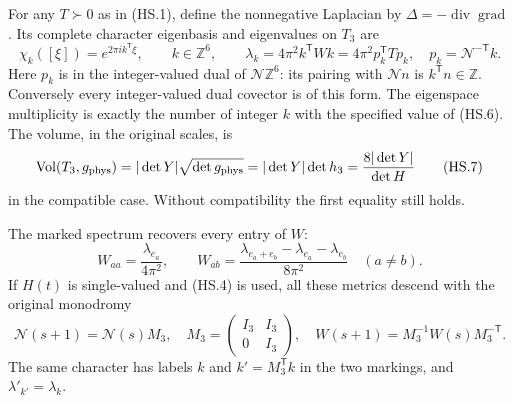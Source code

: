 \begin{theorem}
\label{q444:torus-laplace}
For any $T\succ0$ as in (HS.1), define the nonnegative Laplacian by
$\Delta=-\operatorname{div}\operatorname{grad}$. Its complete character
eigenbasis and eigenvalues on $T_3$ are
\[
 \chi_k([\xi])=e^{2\pi i k^{\mathsf T}\xi},\qquad k\in\mathbb Z^6,
 \qquad
 \lambda_k=4\pi^2 k^{\mathsf T}Wk
          =4\pi^2 p_k^{\mathsf T}Tp_k,\quad
 p_k=\mathcal N^{-\mathsf T}k.                               \tag{HS.6}
\]
Here $p_k$ is in the integer-valued dual of
$\mathcal N\mathbb Z^6$: its pairing with $\mathcal Nn$ is
$k^{\mathsf T}n\in\mathbb Z$. Conversely every integer-valued dual
covector is of this form. The eigenspace multiplicity is exactly
the number of integer $k$ with the specified value of (HS.6).
The volume, in the original scales, is
\[
 \operatorname{Vol}(T_3,g_{\rm phys})
 =|\det Y|\sqrt{\det g_{\rm phys}}
 =|\det Y|\det h_3
 =\frac{8|\det Y|}{\det H}                                  \tag{HS.7}
\]
in the compatible case. Without compatibility the first equality
still holds.

The marked spectrum recovers every entry of $W$:
\[
 W_{aa}=\frac{\lambda_{e_a}}{4\pi^2},\qquad
 W_{ab}=
 \frac{\lambda_{e_a+e_b}-\lambda_{e_a}-\lambda_{e_b}}{8\pi^2}
 \quad(a\ne b).                                             \tag{HS.8}
\]
If $H(t)$ is single-valued and (HS.4) is used, all these metrics
descend with the original monodromy
\[
 \mathcal N(s+1)=\mathcal N(s)M_3,\quad
 M_3=\begin{pmatrix}I_3&I_3\\0&I_3\end{pmatrix},\quad
 W(s+1)=M_3^{-1}W(s)M_3^{-\mathsf T}.                         \tag{HS.9}
\]
The same character has labels $k$ and $k'=M_3^{\mathsf T}k$
in the two markings, and $\lambda'_{k'}=\lambda_k$.
\end{theorem}
